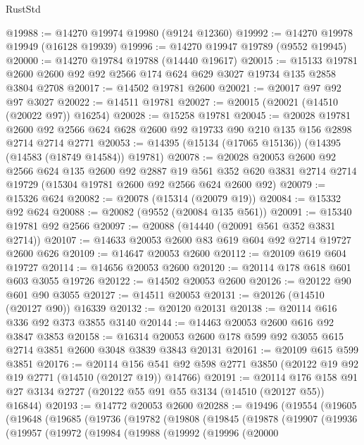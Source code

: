 \begin{lexlean}{RustStd}
\begin{coremodule}
@19988 := @14270 @19974 @19980 (@9124 @12360)
@19992 := @14270 @19978 @19949 (@16128 @19939)
@19996 := @14270 @19947 @19789 (@9552 @19945)
@20000 := @14270 @19784 @19788 (@14440 @19617)
@20015 := @15133 @19781 @2600 @2600 @92 @92 @2566 @174 @624 @629 @3027 @19734 @135 @2858 @3804 @2708
@20017 := @14502 @19781 @2600
@20021 := @20017 @97 @92 @97 @3027
@20022 := @14511 @19781
@20027 := @20015 (@20021 (@14510 (@20022 @97)) @16254)
@20028 := @15258 @19781
@20045 := @20028
    @19781
    @2600
    @92
    @2566
    @624
    @628
    @2600
    @92
    @19733
    @90
    @210
    @135
    @156
    @2898
    @2714
    @2714
    @2771
@20053 := @14395 (@15134 (@17065 @15136)) (@14395 (@14583 (@18749 @14584)) @19781)
@20078 := @20028
    @20053
    @2600
    @92
    @2566
    @624
    @135
    @2600
    @92
    @2887
    @19
    @561
    @352
    @620
    @3831
    @2714
    @2714
    @19729
    (@15304 @19781 @2600 @92 @2566 @624 @2600 @92)
@20079 := @15326 @624
@20082 := @20078 (@15314 (@20079 @19))
@20084 := @15332 @92 @624
@20088 := @20082 (@9552 (@20084 @135 @561))
@20091 := @15340 @19781 @92 @2566
@20097 := @20088 (@14440 (@20091 @561 @352 @3831 @2714))
@20107 := @14633 @20053 @2600 @83 @619 @604 @92 @2714 @19727 @2600 @626
@20109 := @14647 @20053 @2600
@20112 := @20109 @619 @604 @19727
@20114 := @14656 @20053 @2600
@20120 := @20114 @178 @618 @601 @603 @3055 @19726
@20122 := @14502 @20053 @2600
@20126 := @20122 @90 @601 @90 @3055
@20127 := @14511 @20053
@20131 := @20126 (@14510 (@20127 @90)) @16339
@20132 := @20120 @20131
@20138 := @20114 @616 @336 @92 @373 @3855 @3140
@20144 := @14463 @20053 @2600 @616 @92 @3847 @3853
@20158 := @16314 @20053 @2600 @178 @599 @92 @3055 @615 @2714 @3851 @2600 @3048 @3839 @3843 @20131
@20161 := @20109 @615 @599 @3851
@20176 := @20114
    @156
    @541
    @92
    @598
    @2771
    @3850
    (@20122 @19 @92 @19 @2771 (@14510 (@20127 @19)) @14766)
@20191 := @20114
    @176
    @158
    @91
    @27
    @3134
    @2727
    (@20122 @55 @91 @55 @3134 (@14510 (@20127 @55)) @16844)
@20193 := @14772 @20053 @2600
@20288 := @19496
    (@19554
      (@19605
        (@19648
          (@19685
            (@19736
              (@19782
                (@19808
                  (@19845
                    (@19878
                      (@19907
                        (@19936
                          (@19957
                            (@19972
                              (@19984
                                (@19988
                                  (@19992
                                    (@19996
                                      (@20000

\end{coremodule}
\end{lexlean}

